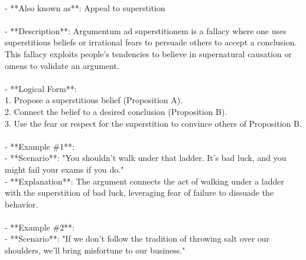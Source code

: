 \documentclass[a4paper,12pt,single,pdftex]{scrartcl}
\begin{document}
    
      
    \\

    
      - **Also known as**: Appeal to superstition
    \\

    
      
    \\

    
      - **Description**: Argumentum ad superstitionem is a fallacy where one uses superstitious beliefs or irrational fears to persuade others to accept a conclusion. This fallacy exploits people's tendencies to believe in supernatural causation or omens to validate an argument.
    \\

    
      
    \\

    
      - **Logical Form**:
    \\

    
        1. Propose a superstitious belief (Proposition A).
    \\

    
        2. Connect the belief to a desired conclusion (Proposition B).
    \\

    
        3. Use the fear or respect for the superstition to convince others of Proposition B.
    \\

    
      
    \\

    
      - **Example \#1**:
    \\

    
        - **Scenario**: "You shouldn't walk under that ladder. It's bad luck, and you might fail your exams if you do."
    \\

    
        - **Explanation**: The argument connects the act of walking under a ladder with the superstition of bad luck, leveraging fear of failure to dissuade the behavior.
    \\

    
      
    \\

    
      - **Example \#2**:
    \\

    
        - **Scenario**: "If we don't follow the tradition of throwing salt over our shoulders, we'll bring misfortune to our business."
    \\
\end{document}

